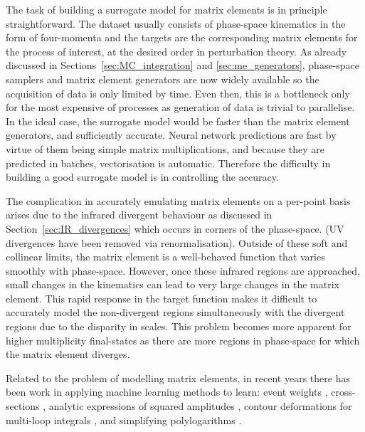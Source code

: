 \documentclass[main.tex]{subfiles}
\begin{document}
    The task of building a surrogate
    model for matrix elements is in principle straightforward.
    The dataset usually consists of phase-space kinematics
    in the form of four-momenta and the targets are the
    corresponding matrix elements for the process of interest,
    at the desired order in perturbation theory. As already
    discussed in Sections~\ref{sec:MC_integration} and \ref{sec:me_generators},
    phase-space samplers and matrix element generators are
    now widely available so the acquisition of data is only
    limited by time. Even then, this is a bottleneck only
    for the most expensive of processes as generation
    of data is trivial to parallelise. In the ideal case, the
    surrogate model would be faster than the matrix
    element generators, and sufficiently accurate. Neural
    network predictions are fast by virtue of them being
    simple matrix multiplications, and because they are predicted
    in batches, vectorisation is automatic. Therefore the difficulty
    in building a good surrogate model is in controlling
    the accuracy.

    The complication in accurately emulating matrix elements
    on a per-point basis arises due to the infrared divergent behaviour
    as discussed in Section~\ref{sec:IR_divergences} which occurs
    in corners of the phase-space.
    (UV divergences have been removed via renormalisation).
    Outside of these soft and collinear limits, the matrix element
    is a well-behaved function that varies smoothly with phase-space.
    However, once these infrared regions are approached, small changes in the
    kinematics can lead to very large changes in the matrix
    element. This rapid response in the target
    function makes it difficult to accurately model the
    non-divergent regions simultaneously with the divergent
    regions due to the disparity in scales. This problem
    becomes more apparent for higher multiplicity final-states
    as there are more regions in phase-space for which
    the matrix element diverges.

    Related to the problem of modelling matrix elements, in recent
    years there has been work in applying machine learning
    methods to learn: event weights \cite{Danziger:2021eeg},
    cross-sections \cite{Otten:2018kum,Buckley:2020bxg},
    analytic expressions of squared amplitudes \cite{Alnuqaydan:2022ncd},
    contour deformations for multi-loop integrals \cite{Winterhalder:2021ngy},
    and simplifying polylogarithms \cite{Dersy:2022bym}.
\end{document}
